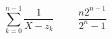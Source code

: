 \begin{displaymath}
 \sum_{k=0}^{n-1}\frac{1}{X - z_k}\hspace{1cm}
\frac{n2^{n-1}}{2^n -1}
\end{displaymath}
